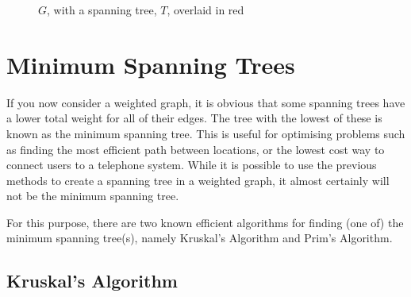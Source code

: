 \begin{figure}[H]
  \centering
  \usetikzlibrary{graphs}
  \caption{$G$, with a spanning tree, $T$, overlaid in red}
\end{figure}

\section*{Minimum Spanning Trees}

If you now consider a weighted graph, it is obvious that some spanning trees have a lower total weight for all of their
 edges. The tree with the lowest of these is known as the minimum spanning tree. This is useful for optimising problems
 such as finding the most efficient path between locations, or the lowest cost way to connect users to a telephone
 system. While it is possible to use the previous methods to create a spanning tree in a weighted graph, it almost
 certainly will not be the minimum spanning tree.

For this purpose, there are two known efficient algorithms for finding (one of) the minimum spanning tree(s), namely
 Kruskal's Algorithm and Prim's Algorithm.

\subsection*{Kruskal's Algorithm}

